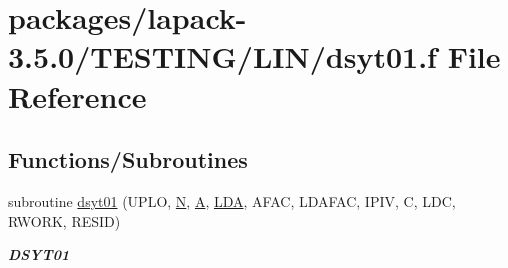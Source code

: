 \hypertarget{dsyt01_8f}{}\section{packages/lapack-\/3.5.0/\+T\+E\+S\+T\+I\+N\+G/\+L\+I\+N/dsyt01.f File Reference}
\label{dsyt01_8f}
\subsection*{Functions/\+Subroutines}
\begin{DoxyCompactItemize}
\item 
subroutine \hyperlink{group__double__lin_gae5935ffc21a0bcaf46bda6cc406368f6}{dsyt01} (U\+P\+L\+O, \hyperlink{polmisc_8c_a0240ac851181b84ac374872dc5434ee4}{N}, \hyperlink{classA}{A}, \hyperlink{example__user_8c_ae946da542ce0db94dced19b2ecefd1aa}{L\+D\+A}, A\+F\+A\+C, L\+D\+A\+F\+A\+C, I\+P\+I\+V, C, L\+D\+C, R\+W\+O\+R\+K, R\+E\+S\+I\+D)
\begin{DoxyCompactList}\small\item\em {\bfseries D\+S\+Y\+T01} \end{DoxyCompactList}\end{DoxyCompactItemize}
